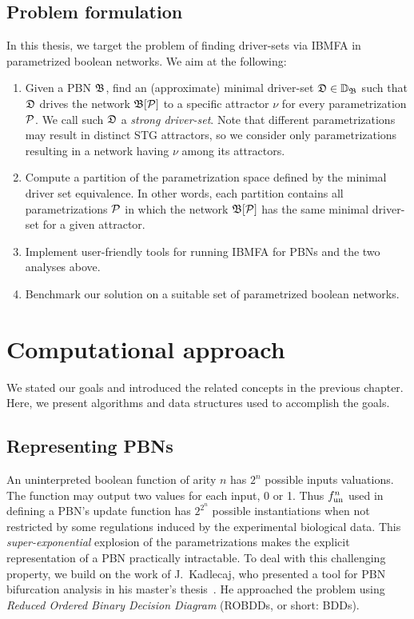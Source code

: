 \documentclass[
	digital, oneside, nosansbold, nocolorbold, nolot, nolof
]{fithesis4}
\theoremstyle{definition}
\theoremstyle{definition}
\begin{document}
\section{Problem formulation}
In this thesis, we target the problem of finding driver-sets via IBMFA in
parametrized boolean networks. We aim at the following:
\begin{enumerate}
    \item Given a PBN $\mathfrak{B}$, find an (approximate) minimal driver-set
        $\mathfrak{D} \in \mathbb{D}_{\mathfrak{B}}$ such that $\mathfrak{D}$ drives the
        network $\mathfrak{B}[\mathcal{P}]$ to a specific attractor $\nu$ for every
        parametrization $\mathcal{P}$. We call such $\mathfrak{D}$ a \emph{strong
        driver-set}. Note that different parametrizations may result in
        distinct STG attractors, so we consider only parametrizations resulting
        in a network having $\nu$ among its attractors.
    \item Compute a partition of the parametrization space defined by the
        minimal driver set equivalence. In other words, each partition contains
        all parametrizations $\mathcal{P}$ in which the network
        $\mathfrak{B}[\mathcal{P}]$ has the same minimal driver-set for a given
        attractor.
    \item Implement user-friendly tools for running IBMFA for PBNs and the two
        analyses above.
    \item Benchmark our solution on a suitable set of parametrized boolean
        networks.
\end{enumerate}

\chapter{Computational approach}

We stated our goals and introduced the related concepts in the previous
chapter. Here, we present algorithms and data structures used to accomplish the
goals.

\section{Representing PBNs}

An uninterpreted boolean function of arity $n$ has $2^n$ possible inputs
valuations. The function may output two values for each input, 0 or 1. Thus
$f_{\textrm{un}}^n$ used in defining a PBN's update function has $2^{2^n}$ possible
instantiations when not restricted by some regulations induced by the
experimental biological data. This \emph{super-exponential} explosion of the
parametrizations makes the explicit representation of a PBN practically
intractable. To deal with this challenging property, we build on the work of
J.~Kadlecaj, who presented a tool for PBN bifurcation analysis in his master's
thesis~\cite{kadlecaj_thesis}. He approached the problem using \emph{Reduced
Ordered Binary Decision Diagram} (ROBDDs, or short: BDDs).
\end{document}
